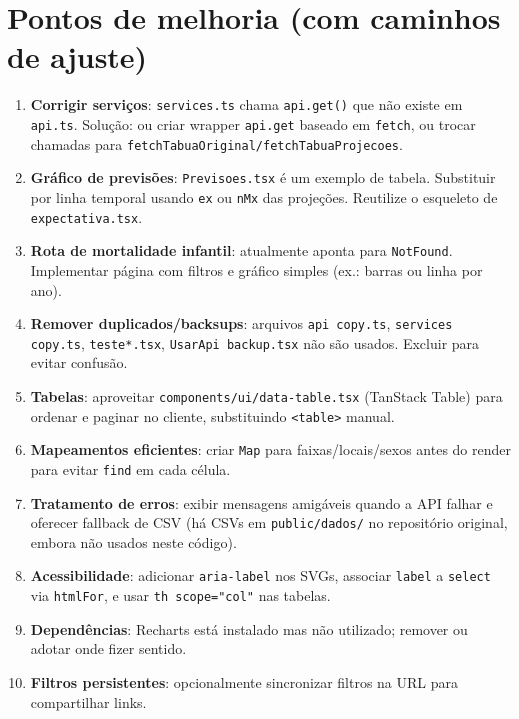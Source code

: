 \documentclass[12pt,a4paper]{article}
\begin{document}
\section{Pontos de melhoria (com caminhos de ajuste)}
\begin{enumerate}[leftmargin=*]
  \item \textbf{Corrigir serviços}: \texttt{services.ts} chama \texttt{api.get()} que não existe em \texttt{api.ts}. Solução: ou criar wrapper \texttt{api.get} baseado em \texttt{fetch}, ou trocar chamadas para \texttt{fetchTabuaOriginal/fetchTabuaProjecoes}.
  \item \textbf{Gráfico de previsões}: \texttt{Previsoes.tsx} é um exemplo de tabela. Substituir por linha temporal usando \texttt{ex} ou \texttt{nMx} das projeções. Reutilize o esqueleto de \texttt{expectativa.tsx}.
  \item \textbf{Rota de mortalidade infantil}: atualmente aponta para \texttt{NotFound}. Implementar página com filtros e gráfico simples (ex.: barras ou linha por ano).
  \item \textbf{Remover duplicados/backsups}: arquivos \texttt{api copy.ts}, \texttt{services copy.ts}, \texttt{teste*.tsx}, \texttt{UsarApi backup.tsx} não são usados. Excluir para evitar confusão.
  \item \textbf{Tabelas}: aproveitar \texttt{components/ui/data-table.tsx} (TanStack Table) para ordenar e paginar no cliente, substituindo \texttt{<table>} manual.
  \item \textbf{Mapeamentos eficientes}: criar \texttt{Map} para faixas/locais/sexos antes do render para evitar \texttt{find} em cada célula.
  \item \textbf{Tratamento de erros}: exibir mensagens amigáveis quando a API falhar e oferecer fallback de CSV (há CSVs em \texttt{public/dados/} no repositório original, embora não usados neste código).
  \item \textbf{Acessibilidade}: adicionar \texttt{aria-label} nos SVGs, associar \texttt{label} a \texttt{select} via \texttt{htmlFor}, e usar \texttt{th scope="col"} nas tabelas.
  \item \textbf{Dependências}: Recharts está instalado mas não utilizado; remover ou adotar onde fizer sentido.
  \item \textbf{Filtros persistentes}: opcionalmente sincronizar filtros na URL para compartilhar links.
\end{enumerate}
\end{document}
